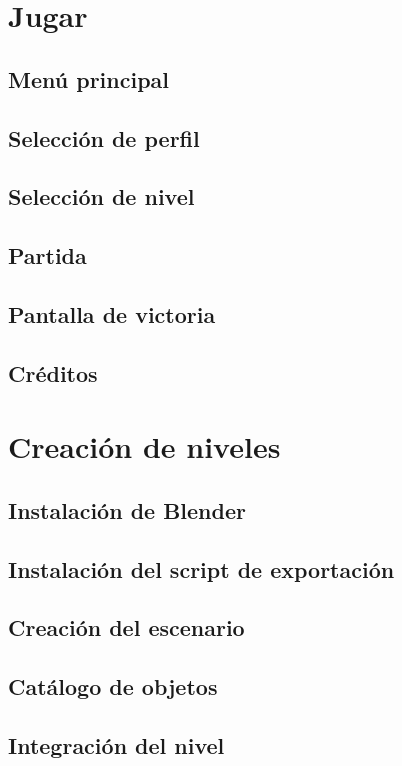 \section*{Jugar}

\subsection*{Menú principal}

\subsection*{Selección de perfil}

\subsection*{Selección de nivel}

\subsection*{Partida}

\subsection*{Pantalla de victoria}

\subsection*{Créditos}



\section*{Creación de niveles}

\subsection*{Instalación de Blender}

\subsection*{Instalación del script de exportación}

\subsection*{Creación del escenario}

\subsection*{Catálogo de objetos}

\subsection*{Integración del nivel}

